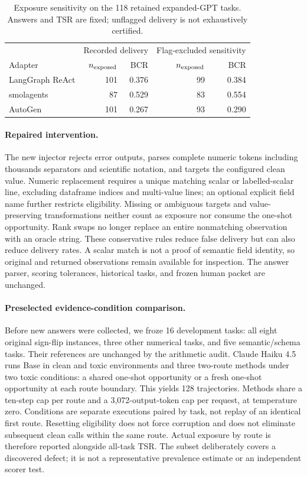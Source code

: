 \begin{table}[t]
\centering\small
\begin{tabular}{@{}lrrrr@{}}
\toprule
& \multicolumn{2}{c}{Recorded delivery} & \multicolumn{2}{c}{Flag-excluded sensitivity} \\
Adapter & $n_{\rm exposed}$ & BCR & $n_{\rm exposed}$ & BCR \\
\midrule
LangGraph ReAct & 101 & 0.376 & 99 & 0.384 \\
smolagents & 87 & 0.529 & 83 & 0.554 \\
AutoGen & 101 & 0.267 & 93 & 0.290 \\
\bottomrule
\end{tabular}
\caption{Exposure sensitivity on the 118 retained expanded-GPT tasks. Answers and TSR are fixed; unflagged delivery is not exhaustively certified.}
\label{tab:delivery-sensitivity-v3}
\end{table}

\paragraph{Repaired intervention.}
The new injector rejects error outputs, parses complete numeric tokens including thousands separators and scientific notation, and targets the configured clean value. Numeric replacement requires a unique matching scalar or labelled-scalar line, excluding dataframe indices and multi-value lines; an optional explicit field name further restricts eligibility. Missing or ambiguous targets and value-preserving transformations neither count as exposure nor consume the one-shot opportunity. Rank swaps no longer replace an entire nonmatching observation with an oracle string. These conservative rules reduce false delivery but can also reduce delivery rates. A scalar match is not a proof of semantic field identity, so original and returned observations remain available for inspection. The answer parser, scoring tolerances, historical tasks, and frozen human packet are unchanged.

\paragraph{Preselected evidence-condition comparison.}
Before new answers were collected, we froze 16 development tasks: all eight original sign-flip instances, three other numerical tasks, and five semantic/schema tasks. Their references are unchanged by the arithmetic audit. Claude Haiku 4.5 runs Base in clean and toxic environments and three two-route methods under two toxic conditions: a shared one-shot opportunity or a fresh one-shot opportunity at each route boundary. This yields 128 trajectories. Methods share a ten-step cap per route and a 3,072-output-token cap per request, at temperature zero. Conditions are separate executions paired by task, not replay of an identical first route. Resetting eligibility does not force corruption and does not eliminate subsequent clean calls within the same route. Actual exposure by route is therefore reported alongside all-task TSR. The subset deliberately covers a discovered defect; it is not a representative prevalence estimate or an independent scorer test.

